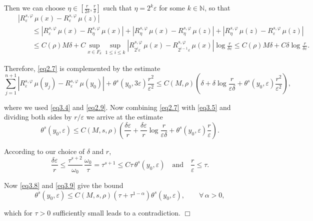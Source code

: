 \documentclass{elsart3-1}
\newcommand{\NN}{{\mathbb{N}}}
\newcommand{\eps}{\varepsilon}
\newcommand{\ep}{\hfill$\Box$ \vskip 0.08in}
\begin{document}
\noindent Then we can choose $\eta\in\left[\frac{r}{2\delta},\frac{r}{\delta}\right]$ such that $\eta=2^k\eps$ for some $k\in\NN$, so that
\begin{eqnarray}\label{eq3.7}
&&|R^{s,\varphi}_{\eps}\,\mu(x)-R^{s,\varphi}_{\eps}\,\mu(z)|\nonumber\\[4pt]\nonumber &&\qquad\leq |R^{s,\varphi}_{\eps}\,\mu(x)-R^{s,\varphi}_{\eta}\,\mu(x)|+
|R^{s,\varphi}_{\eta}\,\mu(x)-R^{s,\varphi}_{\eta}\,\mu(z)|+|R^{s,\varphi}_{\eta}\,\mu(z)-R^{s,\varphi}_{\eps}\,\mu(z)| \\[4pt] &&\qquad
\leq C(\rho)M \delta + C \sup_{x\in F_{\delta}}\sup_{1\leq i\leq k}|R^{s,\varphi}_{2^{i}\eps}\,\mu(x)-R^{s,\varphi}_{2^{i-1}\eps}\,\mu(x)| \log \frac {r}{\delta\eps}\leq C(\rho)M \delta + C \delta \log \frac {r}{\delta\eps}.
\end{eqnarray}

Therefore, \eqref{eq2.7} is complemented by the estimate
\begin{equation}\label{eq3.5}
\sum_{j=1}^{n+1}|R^{s,\varphi}_{\eps}\,\mu(y_j)-R^{s,\varphi}_{\eps}\,\mu(y_0)|+\theta^s(y_0, 3\eps)\frac{r^2}{\eps^2}\leq 
C(M,\rho)\left(\delta+\delta \log \frac{r}{\eps\delta}+ \theta^s(y_0, \eps)\frac{r^2}{\eps^2}\right),\end{equation}

\noindent where we used \eqref{eq3.4} and \eqref{eq2.9}. Now combining \eqref{eq2.7} with \eqref{eq3.5} and dividing both sides by $r/\eps$ we arrive at the estimate
\begin{equation}\label{eq3.8}
\theta^s(y_0,\eps)\leq C(M,s,\rho)\left(\frac{\delta\eps}{r}+\frac{\delta\eps}{r}\log \frac{r}{\eps\delta}+\theta^s(y_0, \eps)\frac{r}{\eps}\right).
\end{equation}

\noindent According to our choice of $\delta$ and $r$, 
\begin{equation}\label{eq3.9}
\frac{\delta\eps}{r}\leq \frac{\tau^{s+2}}{\omega_0}\,\frac{\omega_0}{\tau}=\tau^{s+1}\leq C\tau \,\theta^s(y_0, \eps) \quad \mbox{and}\quad \frac{r}{\eps} \leq \tau.
\end{equation}

 Now \eqref{eq3.8} and \eqref{eq3.9} give the bound
\begin{equation}\label{eq3.10}
\theta^s(y_0,\eps)\leq C(M,s,\rho)\left(\tau +\tau^{1-\alpha}\right)\theta^s(y_0, \eps), \qquad \forall\,\alpha>0,
\end{equation}

\noindent which for $\tau>0$ sufficiently small leads to a contradiction. \ep
\end{document}
